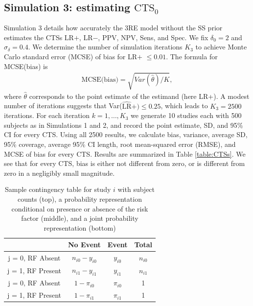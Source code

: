 \documentclass[AMA,STIX1COL]{WileyNJD-v2}
\begin{document}
\subsection{Simulation 3: estimating $\mbox{CTS}_0$} \label{sec:sim_CTS}

Simulation 3 details how accurately the 3RE model without the SS prior estimates the CTSs LR$+$, LR$-$, PPV, NPV, Sens, and Spec. We fix $\delta_0 = 2$ and $\sigma_\delta = 0.4$. We determine the number of simulation iterations $K_3$ to achieve Monte Carlo standard error (MCSE) of bias for LR$+$ $\le 0.01$. The formula for MCSE(bias) is 
\begin{align}
\mbox{MCSE(bias)} = \sqrt{Var(\hat{\theta}) / K}, \nonumber 
\end{align} 
\noindent where $\hat{\theta}$ corresponds to the point estimate of the estimand (here LR+). A modest number of iterations suggests that Var($\widehat{\mbox{LR}}+) \le 0.25$, which leads to $K_3 = 2500$ iterations. For each iteration $k = 1, \dots, K_3$ we generate 10 studies each with 500 subjects as in Simulations 1 and 2, and record the point estimate, SD, and 95\% CI for every CTS. Using all 2500 results, we calculate bias, variance, average SD, 95\% coverage, average 95\% CI length, root mean-squared error (RMSE), and MCSE of bias for every CTS. Results are summarized in Table \ref{table:CTSs}. We see that for every CTS, bias is either not different from zero, or is different from zero in a negligibly small magnitude. 






\clearpage 


\begin{table}[ht]
\centering
\begin{tabular}{c|cc|c}
                           & No Event          & Event       & Total        \\ \hline
j = 0, RF Absent  & $n_{i0} - y_{i0}$ & $y_{i0}$    & $n_{i0}$     \\
j = 1, RF Present & $n_{i1} - y_{i1}$ & $y_{i1}$    & $n_{i1}$     \\ \hline
j = 0, RF Absent & $1 - \pi_{i0}$    & $\pi_{i0}$  & 1            \\
j = 1, RF Present & $1 - \pi_{i1}$    & $\pi_{i1}$  & 1            \\ \hline 
\end{tabular}
\caption{Sample contingency table for study $i$ with subject counts (top), a probability representation conditional on presence or absence of the risk factor (middle), and a joint probability representation (bottom)}
\label{table:RCT_contingency}
\end{table}
\end{document}
